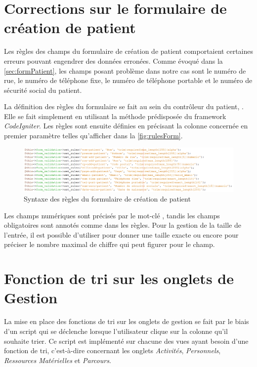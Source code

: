 \documentclass[noposter]{polytech/polytech}
\begin{document}
\section{Corrections sur le formulaire de création de patient}

Les règles des champs du formulaire de création de patient comportaient certaines erreurs pouvant engendrer des données erronées. Comme évoqué dans la \autoref{sec:formPatient}, les champs posant problème dans notre cas sont le numéro de rue, le numéro de téléphone fixe, le numéro de téléphone portable et le numéro de sécurité social du patient. 

La définition des règles du formulaire se fait au sein du contrôleur du patient, . Elle se fait simplement en utilisant la méthode  prédisposée du framework \textit{CodeIgniter}. Les règles sont ensuite définies en précisant la colonne concernée en premier paramètre telles qu'afficher dans la \autoref{fig:rulesForm}.

\begin{figure}
	\includegraphics[scale=0.55]{images/rulesForm}
	\caption{Syntaxe des règles du formulaire de création de patient}
	\label{fig:rulesForm}
\end{figure}

Les champs numériques sont précisés par le mot-clé , tandis les champs obligatoires sont annotés comme  dans les règles. Pour la gestion de la taille de l'entrée, il est possible d'utiliser  pour donner une taille exacte ou encore  pour préciser le nombre maximal de chiffre qui peut figurer pour le champ.


\section{Fonction de tri sur les onglets de Gestion}

La mise en place des fonctions de tri sur les onglets de gestion se fait par le biais d'un script qui se déclenche lorsque l'utilisateur clique sur la colonne qu'il souhaite trier. Ce script est implémenté sur chacune des vues ayant besoin d'une fonction de tri, c'est-à-dire concernant les onglets \textit{Activités}, \textit{Personnels}, \textit{Ressources Matérielles} et \textit{Parcours}. 
\end{document}
